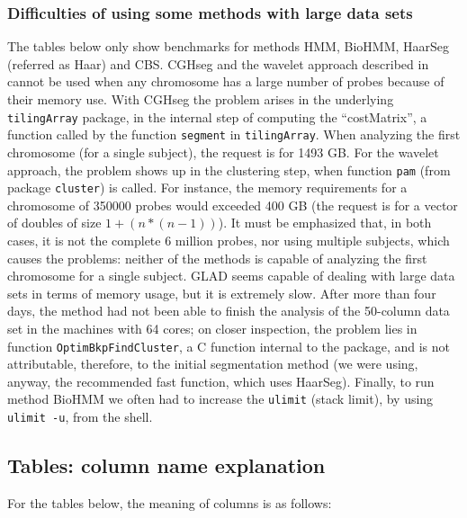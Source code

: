 \documentclass[a4paper,11pt]{article}
\begin{document}
\subsubsection{Difficulties of using some methods with large data sets}\label{methodproblems}

The tables below only show benchmarks for methods HMM, BioHMM, HaarSeg
(referred as Haar) and CBS. CGHseg and the wavelet approach described in
\cite{waves-hsu} cannot be used when any chromosome has a large number of
probes because of their memory use. With CGHseg the problem arises in the
underlying \texttt{tilingArray} package, in the internal step of computing
the ``costMatrix'', a function called by the function \texttt{segment} in
\texttt{tilingArray}.  When analyzing the first chromosome (for a single
subject), the request is for 1493 GB.  For the wavelet approach, the
problem shows up in the clustering step, when function \texttt{pam} (from
package \texttt{cluster}) is called. For instance, the memory requirements
for a chromosome of 350000 probes would exceeded 400 GB (the request is
for a vector of doubles of size $1 + (n * (n - 1))$).  It must be
emphasized that, in both cases, it is not the complete 6 million probes,
nor using multiple subjects, which causes the problems: neither of the
methods is capable of analyzing the first chromosome for a single subject.
GLAD seems capable of dealing with large data sets in terms of memory
usage, but it is extremely slow. After more than four days, the method had
not been able to finish the analysis of the 50-column data set in the
machines with 64 cores; on closer inspection, the problem lies in function
\texttt{OptimBkpFindCluster}, a C function internal to the package, and is
not attributable, therefore, to the initial segmentation method (we were
using, anyway, the recommended fast function, which uses HaarSeg).
Finally, to run method BioHMM we often had to increase the \texttt{ulimit}
(stack limit), by using \texttt{ulimit -u}, from the shell.



\subsection{Tables: column name explanation}
For the tables below, the meaning of columns is as follows:
\end{document}
